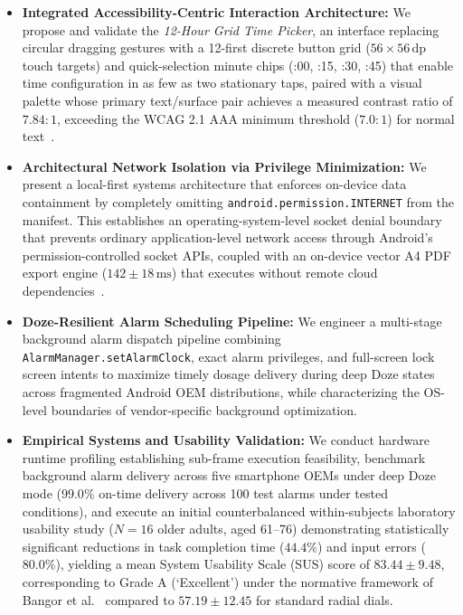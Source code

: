 \documentclass[11pt,a4paper]{article}
\begin{document}
\begin{itemize}[leftmargin=*]
    \item \textbf{Integrated Accessibility-Centric Interaction Architecture:} We propose and validate the \emph{12-Hour Grid Time Picker}, an interface replacing circular dragging gestures with a 12-first discrete button grid ($56\times56\,\text{dp}$ touch targets) and quick-selection minute chips (:00, :15, :30, :45) that enable time configuration in as few as two stationary taps, paired with a visual palette whose primary text/surface pair achieves a measured contrast ratio of $7.84:1$, exceeding the WCAG 2.1 AAA minimum threshold ($7.0:1$) for normal text~\cite{w3c2018wcag}.
    \item \textbf{Architectural Network Isolation via Privilege Minimization:} We present a local-first systems architecture that enforces on-device data containment by completely omitting \texttt{android.permission.INTERNET} from the manifest. This establishes an operating-system-level socket denial boundary that prevents ordinary application-level network access through Android's permission-controlled socket APIs, coupled with an on-device vector A4 PDF export engine ($142 \pm 18\,\text{ms}$) that executes without remote cloud dependencies~\cite{kleppmann2019local}.
    \item \textbf{Doze-Resilient Alarm Scheduling Pipeline:} We engineer a multi-stage background alarm dispatch pipeline combining \texttt{AlarmManager.setAlarmClock}, exact alarm privileges, and full-screen lock screen intents to maximize timely dosage delivery during deep Doze states across fragmented Android OEM distributions, while characterizing the OS-level boundaries of vendor-specific background optimization.
    \item \textbf{Empirical Systems and Usability Validation:} We conduct hardware runtime profiling establishing sub-frame execution feasibility, benchmark background alarm delivery across five smartphone OEMs under deep Doze mode ($99.0\%$ on-time delivery across 100 test alarms under tested conditions), and execute an initial counterbalanced within-subjects laboratory usability study ($N=16$ older adults, aged 61--76) demonstrating statistically significant reductions in task completion time ($44.4\%$) and input errors ($80.0\%$), yielding a mean System Usability Scale (SUS) score of $83.44 \pm 9.48$, corresponding to Grade A (`Excellent') under the normative framework of Bangor et al.~\cite{bangor2008empirical,lewis2009factor} compared to $57.19 \pm 12.45$ for standard radial dials.
\end{itemize}
\end{document}
